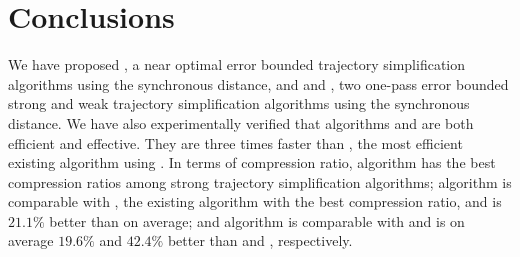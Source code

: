 \section{Conclusions} %
\label{sec-conclusion}

We have proposed \cisto, a near optimal error bounded trajectory simplification algorithms using the  synchronous distance,  and \cist and \cista, two one-pass error bounded strong and weak trajectory simplification algorithms using the synchronous distance.
We have also experimentally verified that algorithms \cist and \cista are both efficient and effective.
They are three times faster than \squishe, the most efficient existing \lsa algorithm using \sed.
%
In terms of compression ratio, 
algorithm \cisto has the best compression ratios among strong trajectory simplification algorithms;
algorithm \cist is {comparable} with \dps, the existing \lsa algorithm with the best compression ratio, and is $21.1\%$ better than \squishe on average; and 
algorithm \cista is comparable with \cisto and is on average $19.6\%$ and $42.4\%$ better than \dps and \squishe, respectively.
